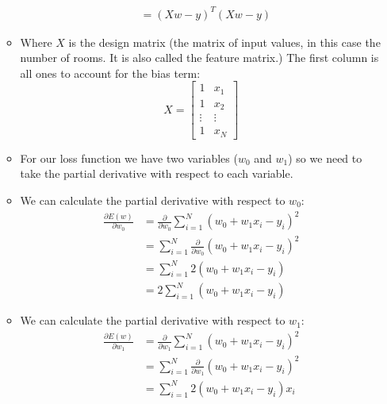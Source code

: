 \documentclass[12pt]{article}
\begin{document}
\begin{itemize}
\begin{itemize}
\begin{align*}
                            &= {(Xw - y)}^T(Xw - y)
                        \end{align*}
                        \item Where $X$ is the design matrix (the matrix of input values, in this case the number of rooms. It is also called the feature matrix.) The first column is all ones to account for the bias term:
                        \begin{equation}
                            X = \begin{bmatrix}
                                1 & x_1\\
                                1 & x_2\\
                                \vdots & \vdots\\
                                1 & x_N
                            \end{bmatrix}
                        \end{equation}
                        \item For our loss function we have two variables ($w_0$ and $w_1$) so we need to take the partial derivative with respect to each variable.
                        \item We can calculate the partial derivative with respect to $w_0$:
                        \begin{align*}
                            \frac{\partial E(w)}{\partial w_0} &= \frac{\partial}{\partial w_0} \sum_{i=1}^N {(w_0 + w_1x_i - y_i)}^2\\
                            &= \sum_{i=1}^N \frac{\partial}{\partial w_0} {(w_0 + w_1x_i - y_i)}^2\\
                            &= \sum_{i=1}^N 2(w_0 + w_1x_i - y_i)\\
                            &= 2 \sum_{i=1}^N (w_0 + w_1x_i - y_i)
                        \end{align*}
                        \item We can calculate the partial derivative with respect to $w_1$:
                        \begin{align*}
                            \frac{\partial E(w)}{\partial w_1} &= \frac{\partial}{\partial w_1} \sum_{i=1}^N {(w_0 + w_1x_i - y_i)}^2\\
                            &= \sum_{i=1}^N \frac{\partial}{\partial w_1} {(w_0 + w_1x_i - y_i)}^2\\
                            &= \sum_{i=1}^N 2(w_0 + w_1x_i - y_i)x_i\\

\end{align*}
\end{itemize}
\end{itemize}
\end{document}
